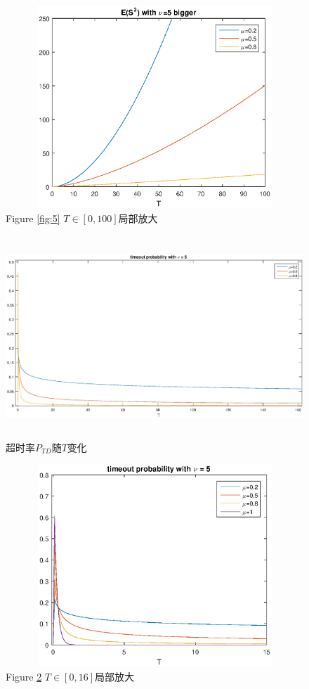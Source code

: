 \documentclass[a4paper, 12pt]{ctexart}
\begin{document}
\begin{figure}[H]
\centering
\includegraphics[width=5in,height=3in]{ES2_bigger.eps}
\caption{Figure \ref{fig:5} $T \in [0,100]$局部放大}
\label{fig:7}
\end{figure}
\bigskip

\begin{figure}[H]
\centering
\includegraphics[width=5in,height=3in]{timeout.eps}
\caption{超时率$P_{TD}$随$T$变化}
\label{fig:8}
\end{figure}
\bigskip

\begin{figure}[H]
\centering
\includegraphics[width=5in,height=3in]{timeout_bigger.eps}
\caption{Figure \ref{fig:8} $T \in [0,16]$局部放大}
\label{fig:9}
\end{figure}
\bigskip
\end{document}
